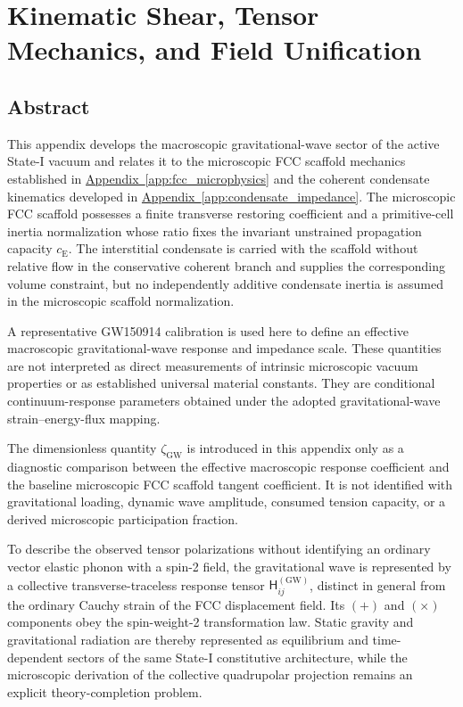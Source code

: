 \chapter{Kinematic Shear, Tensor Mechanics, and Field Unification}
\label{app:kinematic_shear}

\section*{Abstract}

This appendix develops the macroscopic gravitational-wave sector of the active State-I vacuum and relates it to the microscopic FCC scaffold mechanics established in \hyperref[app:fcc_microphysics]{Appendix~\ref*{app:fcc_microphysics}} and the coherent condensate kinematics developed in \hyperref[app:condensate_impedance]{Appendix~\ref*{app:condensate_impedance}}. The microscopic FCC scaffold possesses a finite transverse restoring coefficient and a primitive-cell inertia normalization whose ratio fixes the invariant unstrained propagation capacity $c_{\mathrm{E}}$. The interstitial condensate is carried with the scaffold without relative flow in the conservative coherent branch and supplies the corresponding volume constraint, but no independently additive condensate inertia is assumed in the microscopic scaffold normalization.

A representative GW150914 calibration is used here to define an effective macroscopic gravitational-wave response and impedance scale. These quantities are not interpreted as direct measurements of intrinsic microscopic vacuum properties or as established universal material constants. They are conditional continuum-response parameters obtained under the adopted gravitational-wave strain--energy-flux mapping.

The dimensionless quantity $\zeta_{\mathrm{GW}}$ is introduced in this appendix only as a diagnostic comparison between the effective macroscopic response coefficient and the baseline microscopic FCC scaffold tangent coefficient. It is not identified with gravitational loading, dynamic wave amplitude, consumed tension capacity, or a derived microscopic participation fraction.

To describe the observed tensor polarizations without identifying an ordinary vector elastic phonon with a spin-2 field, the gravitational wave is represented by a collective transverse-traceless response tensor $\mathsf{H}_{ij}^{(\mathrm{GW})}$, distinct in general from the ordinary Cauchy strain of the FCC displacement field. Its $(+)$ and $(\times)$ components obey the spin-weight-2 transformation law. Static gravity and gravitational radiation are thereby represented as equilibrium and time-dependent sectors of the same State-I constitutive architecture, while the microscopic derivation of the collective quadrupolar projection remains an explicit theory-completion problem.

